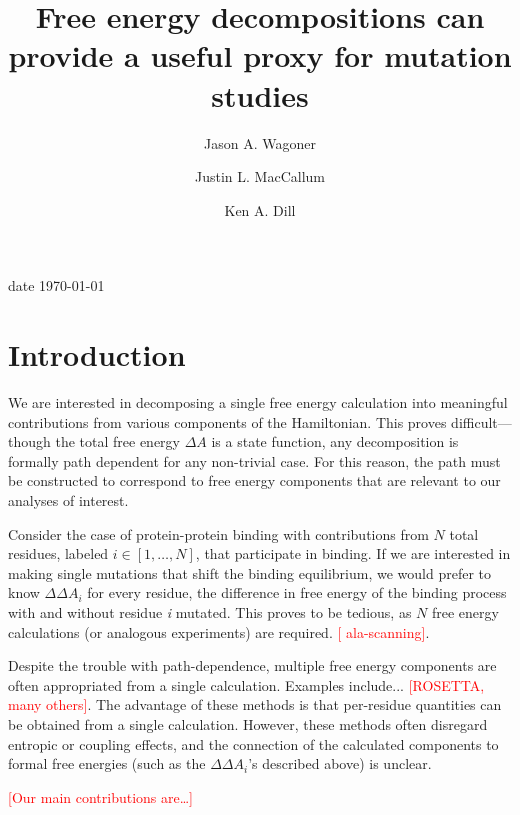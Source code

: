 \documentclass[%
 preprint,
 amsmath,amssymb,
 aps,
]{revtex4-1}
\newcommand{\warning}[1]{{\textsf{{\textcolor{red}{{[#1]}{}}}}}}
\begin{document}
\title{Free energy decompositions can provide a useful proxy for mutation studies}
\author{Jason A. Wagoner}
\author{Justin L. MacCallum}
\author{Ken A. Dill}

date{ \today}


\begin{abstract}

\end{abstract}

\maketitle

\section{Introduction}

We are interested in decomposing a single free energy calculation into meaningful contributions from various components of  the Hamiltonian.  This proves difficult---though the total free energy $\Delta A$ is a state function, any decomposition is formally path dependent for any non-trivial case.  For this reason, the path must be constructed to correspond to free energy components that are relevant to our analyses of interest.

Consider the case of protein-protein binding with contributions from $N$ total residues, labeled $i\in \left[ 1, \dots, N\right]$, that participate in binding.  If we are interested in making single mutations that shift the binding equilibrium, we would prefer to know $\Delta \Delta A_i$ for every residue, 
the difference in free energy of the binding process with and without residue \textit{i} mutated.   This proves to be tedious, as $N$ free energy calculations (or analogous experiments) are required.   \warning{ ala-scanning}.  

Despite the trouble with path-dependence, multiple free energy components are often appropriated from a single calculation.  Examples include... \warning{ROSETTA, many others}.  The advantage of these methods is that per-residue quantities can be obtained from a single calculation. However, these methods often disregard entropic or coupling effects, and the connection of the calculated components to formal free energies (such as the $\Delta \Delta A_i$'s described above) is unclear.  

\warning{Our main contributions are\dots}
\end{document}
